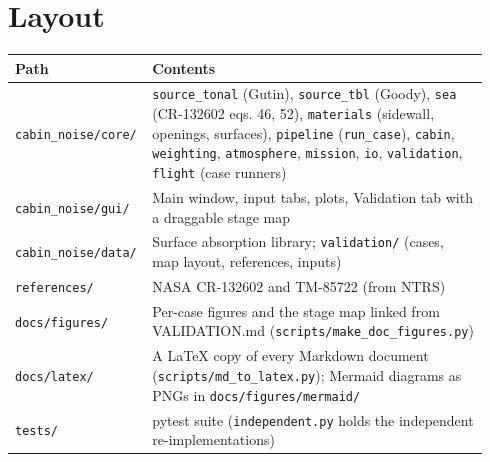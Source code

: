 \documentclass[10pt,a4paper]{article}
\begin{document}
\section*{Layout}

{\small
\begin{longtable}{>{\raggedright\arraybackslash}p{0.232\linewidth}>{\raggedright\arraybackslash}p{0.708\linewidth}}
\hline
\textbf{Path} & \textbf{Contents} \\
\hline
\endhead
\texttt{cabin\_\allowbreak{}noise/\allowbreak{}core/\allowbreak{}} & \texttt{source\_\allowbreak{}tonal} (Gutin), \texttt{source\_\allowbreak{}tbl} (Goody), \texttt{sea} (CR-132602 eqs. 46, 52), \texttt{materials} (sidewall, openings, surfaces), \texttt{pipeline} (\texttt{run\_\allowbreak{}case}), \texttt{cabin}, \texttt{weighting}, \texttt{atmosphere}, \texttt{mission}, \texttt{io}, \texttt{validation}, \texttt{flight} (case runners) \\
\texttt{cabin\_\allowbreak{}noise/\allowbreak{}gui/\allowbreak{}} & Main window, input tabs, plots, Validation tab with a draggable stage map \\
\texttt{cabin\_\allowbreak{}noise/\allowbreak{}data/\allowbreak{}} & Surface absorption library; \texttt{validation/\allowbreak{}} (cases, map layout, references, inputs) \\
\texttt{references/\allowbreak{}} & NASA CR-132602 and TM-85722 (from NTRS) \\
\texttt{docs/\allowbreak{}figures/\allowbreak{}} & Per-case figures and the stage map linked from VALIDATION.md (\texttt{scripts/\allowbreak{}make\_\allowbreak{}doc\_\allowbreak{}figures.\allowbreak{}py}) \\
\texttt{docs/\allowbreak{}latex/\allowbreak{}} & A LaTeX copy of every Markdown document (\texttt{scripts/\allowbreak{}md\_\allowbreak{}to\_\allowbreak{}latex.\allowbreak{}py}); Mermaid diagrams as PNGs in \texttt{docs/\allowbreak{}figures/\allowbreak{}mermaid/\allowbreak{}} \\
\texttt{tests/\allowbreak{}} & pytest suite (\texttt{independent.\allowbreak{}py} holds the independent re-implementations) \\
\hline
\end{longtable}}
\end{document}
